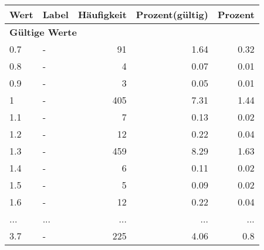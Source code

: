      \begin{longtable}{lXrrr}
     \toprule
     \textbf{Wert} & \textbf{Label} & \textbf{Häufigkeit} & \textbf{Prozent(gültig)} & \textbf{Prozent} \\
     \endhead
     \midrule
     \multicolumn{5}{l}{\textbf{Gültige Werte}}\\
        0.7 & \multicolumn{1}{X}{-} & %
          \num{91} &
          \num[round-mode=places,round-precision=2]{1.64} &
          \num[round-mode=places,round-precision=2]{0.32} \\
        0.8 & \multicolumn{1}{X}{-} & %
          \num{4} &
          \num[round-mode=places,round-precision=2]{0.07} &
          \num[round-mode=places,round-precision=2]{0.01} \\
        0.9 & \multicolumn{1}{X}{-} & %
          \num{3} &
          \num[round-mode=places,round-precision=2]{0.05} &
          \num[round-mode=places,round-precision=2]{0.01} \\
        1 & \multicolumn{1}{X}{-} & %
          \num{405} &
          \num[round-mode=places,round-precision=2]{7.31} &
          \num[round-mode=places,round-precision=2]{1.44} \\
        1.1 & \multicolumn{1}{X}{-} & %
          \num{7} &
          \num[round-mode=places,round-precision=2]{0.13} &
          \num[round-mode=places,round-precision=2]{0.02} \\
        1.2 & \multicolumn{1}{X}{-} & %
          \num{12} &
          \num[round-mode=places,round-precision=2]{0.22} &
          \num[round-mode=places,round-precision=2]{0.04} \\
        1.3 & \multicolumn{1}{X}{-} & %
          \num{459} &
          \num[round-mode=places,round-precision=2]{8.29} &
          \num[round-mode=places,round-precision=2]{1.63} \\
        1.4 & \multicolumn{1}{X}{-} & %
          \num{6} &
          \num[round-mode=places,round-precision=2]{0.11} &
          \num[round-mode=places,round-precision=2]{0.02} \\
        1.5 & \multicolumn{1}{X}{-} & %
          \num{5} &
          \num[round-mode=places,round-precision=2]{0.09} &
          \num[round-mode=places,round-precision=2]{0.02} \\
        1.6 & \multicolumn{1}{X}{-} & %
          \num{12} &
          \num[round-mode=places,round-precision=2]{0.22} &
          \num[round-mode=places,round-precision=2]{0.04} \\
       ... & ... & ... & ... & ... \\
        3.7 & \multicolumn{1}{X}{-} & %
          \num{225} &
          \num[round-mode=places,round-precision=2]{4.06} &
          \num[round-mode=places,round-precision=2]{0.8} \\


\end{longtable}
